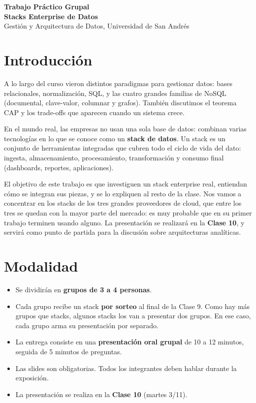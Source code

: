 \documentclass[12pt]{article}
\begin{document}
\begin{center}
  {\LARGE \textbf{Trabajo Práctico Grupal \\ Stacks Enterprise de Datos}}\\[0.5em]
  {Gestión y Arquitectura de Datos, Universidad de San Andrés}
\end{center}

\section{Introducción}

A lo largo del curso vieron distintos paradigmas para gestionar datos: bases relacionales, normalización, SQL, y las cuatro grandes familias de NoSQL (documental, clave-valor, columnar y grafos). También discutimos el teorema CAP y los trade-offs que aparecen cuando un sistema crece.

\bigskip

En el mundo real, las empresas no usan una sola base de datos: combinan varias tecnologías en lo que se conoce como un \textbf{stack de datos}. Un stack es un conjunto de herramientas integradas que cubren todo el ciclo de vida del dato: ingesta, almacenamiento, procesamiento, transformación y consumo final (dashboards, reportes, aplicaciones).

\bigskip

El objetivo de este trabajo es que investiguen un stack enterprise real, entiendan cómo se integran sus piezas, y se lo expliquen al resto de la clase. Nos vamos a concentrar en los stacks de los tres grandes proveedores de cloud, que entre los tres se quedan con la mayor parte del mercado: es muy probable que en su primer trabajo terminen usando alguno. La presentación se realizará en la \textbf{Clase 10}, y servirá como punto de partida para la discusión sobre arquitecturas analíticas.

\section{Modalidad}

\begin{itemize}
    \item Se dividirán en \textbf{grupos de 3 a 4 personas}.
    \item Cada grupo recibe un stack \textbf{por sorteo} al final de la Clase 9. Como hay más grupos que stacks, algunos stacks los van a presentar dos grupos. En ese caso, cada grupo arma su presentación por separado.
    \item La entrega consiste en una \textbf{presentación oral grupal} de 10 a 12 minutos, seguida de 5 minutos de preguntas.
    \item Las slides son obligatorias. Todos los integrantes deben hablar durante la exposición.
    \item La presentación se realiza en la \textbf{Clase 10} (martes 3/11).
\end{itemize}
\end{document}

